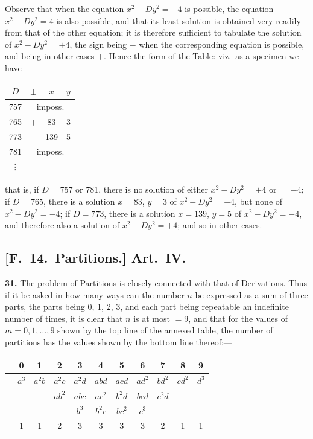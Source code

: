 \documentclass[11pt,a4paper]{book}
\begin{document}
Observe that when the equation $x^{2} - Dy^{2} = -4$ is possible, the equation $x^{2} - Dy^{2} = 4$ is also possible,
and that its least solution is obtained very readily from that of the other equation; it is therefore
sufficient to tabulate the solution of $x^{2} - Dy^{2} = \pm 4$, the sign being $-$ when the
corresponding equation is possible, and being in other cases $+$. Hence the form of
the Table: viz.\ as a specimen we have
\begin{center}\begin{tabular}{c|c|c|c}$D$ & $\pm$ & $x$ & $y$ \\
\hline
757 & \multicolumn{3}{c}{imposs.} \\
765 & $+$ & 83 & 3 \\
773 & $-$ & 139 & 5 \\
781 & \multicolumn{3}{c}{imposs.} \\
\vdots & & & \\
\end{tabular}\end{center}

that is, if $D = 757$ or 781, there is no solution of either $x^{2} - Dy^{2} = +4$ or $= -4$; if
$D = 765$, there is a solution $x = 83$, $y = 3$ of $x^{2} - Dy^{2} = +4$, but none of $x^{2} - Dy^{2} = -4$;
if $D = 773$, there is a solution $x = 139$, $y = 5$ of $x^{2} - Dy^{2} = -4$, and therefore also a
solution of $x^{2} - Dy^{2} = +4$; and so in other cases.


\newpage
\subsection*{[F.\ 14.\ Partitions.] Art.\ IV.}

\textbf{31.} The problem of Partitions is closely connected with that of Derivations.
Thus if it be asked in how many ways can the number $n$ be expressed as a sum
of three parts, the parts being 0, 1, 2, 3, and each part being repeatable an indefinite
number of times, it is clear that $n$ is at most $= 9$, and that for the values of
$m = 0, 1, \ldots, 9$ shown by the top line of the annexed table, the number of partitions
has the values shown by the bottom line thereof:---

\begin{center}
\begin{tabular}{c|cccccccccc}
 & 0 & 1 & 2 & 3 & 4 & 5 & 6 & 7 & 8 & 9 \\
\hline
 & $a^{3}$ & $a^{2}b$ & $a^{2}c$ & $a^{2}d$ & $abd$ & $acd$ & $ad^{2}$ & $bd^{2}$ & $cd^{2}$ & $d^{3}$ \\
 & & & $ab^{2}$ & $abc$ & $ac^{2}$ & $b^{2}d$ & $bcd$ & $c^{2}d$ & & \\
 & & & & $b^{3}$ & $b^{2}c$ & $bc^{2}$ & $c^{3}$ & & & \\
\hline
 & 1 & 1 & 2 & 3 & 3 & 3 & 3 & 2 & 1 & 1 \\
\end{tabular}
\end{center}
\end{document}
